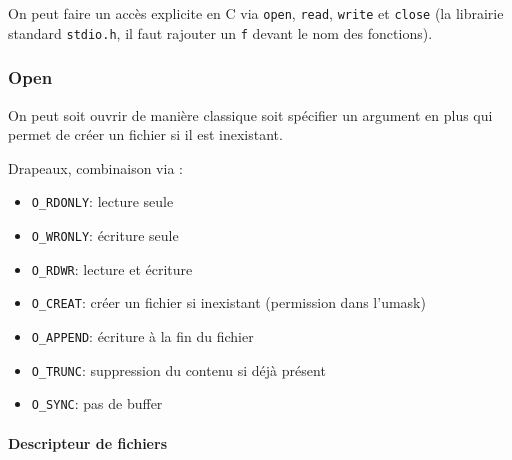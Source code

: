 On peut faire un accès explicite en C via \texttt{open}, \texttt{read},
\texttt{write} et \texttt{close} (la librairie standard
\texttt{stdio.h}, il faut rajouter un \texttt{f} devant le nom des
fonctions).

\subsubsection{Open}\label{open}

On peut soit ouvrir de manière classique soit spécifier un argument en
plus qui permet de créer un fichier si il est inexistant.

\begin{Shaded}
\begin{Highlighting}[]
\PreprocessorTok{ }

\OperatorTok{(}  \OperatorTok{*}\OperatorTok{,} \OperatorTok{);}
\OperatorTok{(} \OperatorTok{*}\OperatorTok{,} \OperatorTok{,}\OperatorTok{);}
\end{Highlighting}
\end{Shaded}

Drapeaux, combinaison via \texttt{\textbar{}} :

\begin{itemize}
\tightlist
\item
  \texttt{O\_RDONLY}: lecture seule
\item
  \texttt{O\_WRONLY}: écriture seule
\item
  \texttt{O\_RDWR}: lecture et écriture
\item
  \texttt{O\_CREAT}: créer un fichier si inexistant (permission dans
  l'umask)
\item
  \texttt{O\_APPEND}: écriture à la fin du fichier
\item
  \texttt{O\_TRUNC}: suppression du contenu si déjà présent
\item
  \texttt{O\_SYNC}: pas de buffer
\end{itemize}

\paragraph{Descripteur de fichiers}\label{descripteur-de-fichiers}

